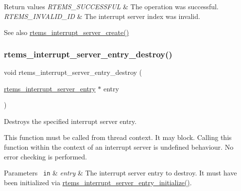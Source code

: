 \begin{DoxyRetVals}{Return values}
{\em R\+T\+E\+M\+S\+\_\+\+S\+U\+C\+C\+E\+S\+S\+F\+UL} & The operation was successful. \\
\hline
{\em R\+T\+E\+M\+S\+\_\+\+I\+N\+V\+A\+L\+I\+D\+\_\+\+ID} & The interrupt server index was invalid.\\
\hline
\end{DoxyRetVals}
\begin{DoxySeeAlso}{See also}
\mbox{\hyperlink{group__rtems__interrupt__extension_gad7725dd729bfd34f36c0de4d9c326abc}{rtems\+\_\+interrupt\+\_\+server\+\_\+create()}} 
\end{DoxySeeAlso}
\mbox{\label{group__rtems__interrupt__extension_ga8926167fe72ef23335bd242b0380c038}} 
\subsubsection{\texorpdfstring{rtems\_interrupt\_server\_entry\_destroy()}{rtems\_interrupt\_server\_entry\_destroy()}}
{\footnotesize\ttfamily void rtems\+\_\+interrupt\+\_\+server\+\_\+entry\+\_\+destroy (\begin{DoxyParamCaption}\item[{\mbox{\hyperlink{structrtems__interrupt__server__entry}{rtems\+\_\+interrupt\+\_\+server\+\_\+entry}} $\ast$}]{entry }\end{DoxyParamCaption})}



Destroys the specified interrupt server entry. 

This function must be called from thread context. It may block. Calling this function within the context of an interrupt server is undefined behaviour. No error checking is performed.


\begin{DoxyParams}[1]{Parameters}
\mbox{\texttt{ in}}  & {\em entry} & The interrupt server entry to destroy. It must have been initialized via \mbox{\hyperlink{group__rtems__interrupt__extension_ga86ea2e100b06ad64fa320381bb34d2d1}{rtems\+\_\+interrupt\+\_\+server\+\_\+entry\+\_\+initialize()}}. \\
\hline
\end{DoxyParams}
\mbox{\label{group__rtems__interrupt__extension_ga86ea2e100b06ad64fa320381bb34d2d1}} 
